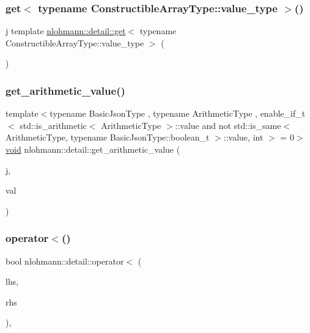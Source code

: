 \subsubsection{\texorpdfstring{get$<$ typename Constructible\+Array\+Type\+::value\+\_\+type $>$()}{get< typename ConstructibleArrayType::value\_type >()}}
{\footnotesize\ttfamily j template \hyperlink{namespacenlohmann_1_1detail_acc422c11342b31368f610b6f96fcedc6}{nlohmann\+::detail\+::get}$<$ typename Constructible\+Array\+Type\+::value\+\_\+type $>$ (\begin{DoxyParamCaption}{ }\end{DoxyParamCaption})}

\mbox{\label{namespacenlohmann_1_1detail_a85955b9c6dd31846e4b8e891f78614b6}} 
\subsubsection{\texorpdfstring{get\+\_\+arithmetic\+\_\+value()}{get\_arithmetic\_value()}}
{\footnotesize\ttfamily template$<$typename Basic\+Json\+Type , typename Arithmetic\+Type , enable\+\_\+if\+\_\+t$<$ std\+::is\+\_\+arithmetic$<$ Arithmetic\+Type $>$\+::value and not std\+::is\+\_\+same$<$ Arithmetic\+Type, typename Basic\+Json\+Type\+::boolean\+\_\+t $>$\+::value, int $>$  = 0$>$ \\
\hyperlink{namespacenlohmann_1_1detail_a59fca69799f6b9e366710cb9043aa77d}{void} nlohmann\+::detail\+::get\+\_\+arithmetic\+\_\+value (\begin{DoxyParamCaption}\item[{const Basic\+Json\+Type \&}]{j,  }\item[{Arithmetic\+Type \&}]{val }\end{DoxyParamCaption})}

\mbox{\label{namespacenlohmann_1_1detail_a09169efff3bd1771fff29bd92cea19e0}} 
\subsubsection{\texorpdfstring{operator$<$()}{operator<()}}
{\footnotesize\ttfamily bool nlohmann\+::detail\+::operator$<$ (\begin{DoxyParamCaption}\item[{const \hyperlink{namespacenlohmann_1_1detail_a1ed8fc6239da25abcaf681d30ace4985}{value\+\_\+t}}]{lhs,  }\item[{const \hyperlink{namespacenlohmann_1_1detail_a1ed8fc6239da25abcaf681d30ace4985}{value\+\_\+t}}]{rhs }\end{DoxyParamCaption})\hspace{0.3cm}{\ttfamily [inline]}, {\ttfamily [noexcept]}}



